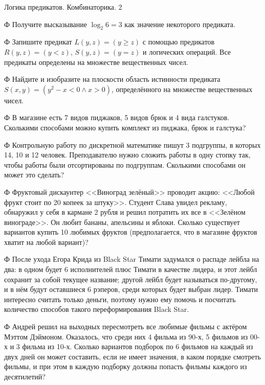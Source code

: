 \newpage 

{Логика предикатов. Комбинаторика.}
{2}

\begin{problemList}

\problemItemSimple
{Ф}
{Получите высказывание $\log_{2}{6} = 3$ как значение некоторого предиката.}

\problemItemSimple
{Ф}
{Запишите предикат $L(y, z) = (y \geq z)$ с помощью предикатов $R(y, z) = (y < z)$, $S(y, z) = (y =z)$ и логических операций. Все предикаты определены на множестве вещественных чисел.}

\problemItemSimple
{Ф}
{Найдите и изобразите на плоскости область истинности предиката $S(x, y) = (y^2-x < 0 \wedge x > 0)$, определённого на множестве вещественных чисел.}

\problemItemSimple
{Ф}
{В магазине есть 7 видов пиджаков, 5 видов брюк и 4 вида галстуков. Сколькими способами можно купить комплект из пиджака, брюк и галстука?}

\problemItemSimple
{Ф}
{Контрольную работу по дискретной математике пишут 3 подгруппы, в которых 14, 10 и 12 человек. Преподавателю нужно сложить работы в одну стопку так, чтобы работы были отсортированы по подгруппам. Сколькими способами он может это сделать?}

\problemItemSimple
{Ф}
{Фруктовый дискаунтер <<Виноград зелёный>> проводит акцию: <<Любой фрукт стоит по 20 копеек за штуку>>. Студент Слава увидел рекламу, обнаружил у себя в кармане 2 рубля и решил потратить их все в <<Зелёном винограде>>. Он любит бананы, апельсины и яблоки. Сколько существует вариантов купить 10 любимых фруктов (предполагается, что в магазине фруктов хватит на любой вариант)?}

\problemItemSimple
{Ф}
{После ухода Егора Крида из Black Star Тимати задумался о распаде лейбла на два: в одном будет 6 исполнителей плюс Тимати в качестве лидера, и этот лейбл сохранит за собой текущее название; другой лейбл будет называться по-другому, и в нём будут оставшиеся 6 рэперов, среди которых будет выбран лидер. Тимати интересно считать только деньги, поэтому нужно ему помочь и посчитать количество способов такого переформирования Black Star.}

\problemItemSimple
{Ф}
{Андрей решил на выходных пересмотреть все любимые фильмы с актёром Мэттом Дэймоном. Оказалось, что среди них 4 фильма из 90-х, 5 фильмов из 00-х и 3 фильма из 10-х. Сколько вариантов подборок по 6 фильмов на каждый из двух дней он может составить, если не имеет значения, в каком порядке смотреть фильмы, и при этом в каждую подборку должны попасть фильмы каждого из десятилетий?}

\end{problemList}

